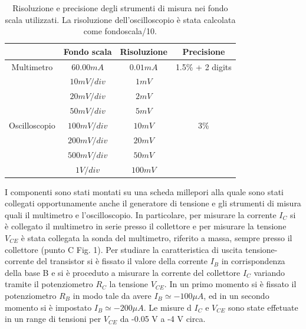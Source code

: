 \documentclass[a4paper,11pt]{article}
\begin{document}
\begin{table}[h!]
  \begin{center}
    \begin{tabular}{|c|c|c|c|}
      \hline
                                     & Fondo scala  & Risoluzione & Precisione           \\
      \hline
      Multimetro                     & $60.00 mA$   & $0.01 mA$   & 1.5\% + 2 digits     \\
      \hline
      \multirow{7}{*}{Oscilloscopio} & $10 mV/div$  & $1 mV$      & \multirow{7}{*}{3\%} \\
                                     & $20 mV/div$  & $2 mV$      &                      \\
                                     & $50 mV/div$  & $5 mV$      &                      \\
                                     & $100 mV/div$ & $10 mV$     &                      \\
                                     & $200 mV/div$ & $20 mV$     &                      \\
                                     & $500 mV/div$ & $50 mV$     &                      \\
                                     & $1 V/div$    & $100 mV$    &                      \\
      \hline
    \end{tabular}
    \caption{Risoluzione e precisione degli strumenti di misura nei fondo scala utilizzati. La risoluzione dell'oscilloscopio è stata calcolata come fondoscala/10.}
  \end{center}
\end{table}

I componenti sono stati montati su una scheda millepori alla quale sono stati collegati opportunamente anche il generatore di tensione e gli strumenti di misura quali il multimetro e l'oscilloscopio. In particolare, per misurare la corrente $I_C$ si è collegato il multimetro in serie presso il collettore e per misurare la tensione $V_{CE}$ è stata collegata la sonda del multimetro, riferito a massa, sempre presso il collettore (punto C Fig. 1).
Per studiare la caratteristica di uscita tensione-corrente del transistor si è fissato il valore della corrente $I_B$ in corrispondenza della base B e si è proceduto a misurare la corrente del collettore $I_C$ variando tramite il potenziometro $R_C$ la tensione $V_{CE}$.
\newline
In un primo momento si è fissato il potenziometro $R_B$ in modo tale da avere $I_B \simeq -100 \mu A$,  ed in un secondo momento si è impostato $I_B \simeq -200 \mu A$. Le misure d $I_C$ e $V_{CE}$ sono state effetuate in un range di tensioni per $V_{CE}$ da -0.05 V a -4 V circa.
\end{document}
